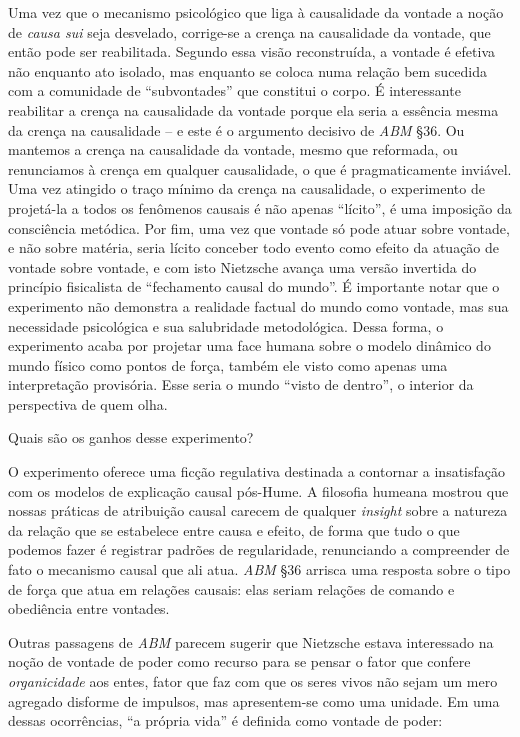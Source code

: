 \documentclass[
	12pt,				%
	openright,			%
	oneside,			%
	a4paper,			%
	english,			%
	french,				%
	spanish,			%
	brazil				%
	]{abntex2}
\begin{document}
Uma vez que o mecanismo psicológico que liga à causalidade da vontade a noção de \textit{causa sui} seja desvelado, corrige-se a crença na causalidade da vontade, que então pode ser reabilitada. Segundo essa visão reconstruída, a vontade é efetiva não enquanto ato isolado, mas enquanto se coloca numa relação bem sucedida com a comunidade de “subvontades” que constitui o corpo. É interessante reabilitar a crença na causalidade da vontade porque ela seria a essência mesma da crença na causalidade – e este é o argumento decisivo de \textit{ABM} §36. Ou mantemos a crença na causalidade da vontade, mesmo que reformada, ou renunciamos à crença em qualquer causalidade, o que é pragmaticamente inviável. Uma vez atingido o traço mínimo da crença na causalidade, o experimento de projetá-la a todos os fenômenos causais é não apenas “lícito”, é uma imposição da consciência metódica. Por fim, uma vez que vontade só pode atuar sobre vontade, e não sobre matéria, seria lícito conceber todo evento como efeito da atuação de vontade sobre vontade, e com isto Nietzsche avança uma versão invertida do princípio fisicalista de “fechamento causal do mundo”. É importante notar que o experimento não demonstra a realidade factual do mundo como vontade, mas sua necessidade psicológica e sua salubridade metodológica. Dessa forma, o experimento acaba por projetar uma face humana sobre o modelo dinâmico do mundo físico como pontos de força, também ele visto como apenas uma interpretação  provisória. Esse seria o mundo “visto de dentro”, o interior da perspectiva de quem olha.

	Quais são os ganhos desse experimento?
	
	O experimento oferece uma ficção regulativa destinada a contornar a insatisfação com os modelos de explicação causal pós-Hume. A filosofia humeana mostrou que nossas práticas de atribuição causal carecem de qualquer \textit{insight} sobre a natureza da relação que se estabelece entre causa e efeito, de forma que tudo o que podemos fazer é registrar padrões de regularidade, renunciando a compreender de fato o mecanismo causal que ali atua. \textit{ABM} §36 arrisca uma resposta sobre o tipo de força que atua em relações causais: elas seriam relações de comando e obediência entre vontades.

Outras passagens de \textit{ABM} parecem sugerir que Nietzsche estava interessado na noção de vontade de poder como recurso para se pensar o fator que confere \textit{organicidade} aos entes, fator que faz com que os seres vivos não sejam um mero agregado disforme de impulsos, mas apresentem-se como uma unidade. Em uma dessas ocorrências, “a própria vida” é definida como vontade de poder:
\end{document}
